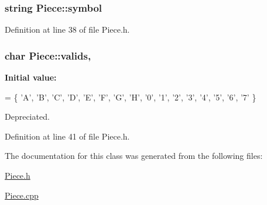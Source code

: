\subsubsection[{\texorpdfstring{symbol}{symbol}}]{\setlength{\rightskip}{0pt plus 5cm}string Piece\+::symbol\hspace{0.3cm}{\ttfamily [protected]}}\hypertarget{class_piece_ab1063e521716374d9a97eddf169be096}{}\label{class_piece_ab1063e521716374d9a97eddf169be096}


Definition at line 38 of file Piece.\+h.

\subsubsection[{\texorpdfstring{valids}{valids}}]{\setlength{\rightskip}{0pt plus 5cm}char Piece\+::valids\hspace{0.3cm}{\ttfamily [static]}, {\ttfamily [protected]}}\hypertarget{class_piece_af96dfaa19d200cac55748774dbb1a56a}{}\label{class_piece_af96dfaa19d200cac55748774dbb1a56a}
{\bfseries Initial value\+:}
\begin{DoxyCode}
= \{
    \textcolor{charliteral}{'A'}, \textcolor{charliteral}{'B'}, \textcolor{charliteral}{'C'}, \textcolor{charliteral}{'D'}, \textcolor{charliteral}{'E'}, \textcolor{charliteral}{'F'}, \textcolor{charliteral}{'G'}, \textcolor{charliteral}{'H'},
    \textcolor{charliteral}{'0'}, \textcolor{charliteral}{'1'}, \textcolor{charliteral}{'2'}, \textcolor{charliteral}{'3'}, \textcolor{charliteral}{'4'}, \textcolor{charliteral}{'5'}, \textcolor{charliteral}{'6'}, \textcolor{charliteral}{'7'}
\}
\end{DoxyCode}
Depreciated. 

Definition at line 41 of file Piece.\+h.



The documentation for this class was generated from the following files\+:\begin{DoxyCompactItemize}
\item 
\hyperlink{_piece_8h}{Piece.\+h}\item 
\hyperlink{_piece_8cpp}{Piece.\+cpp}\end{DoxyCompactItemize}
